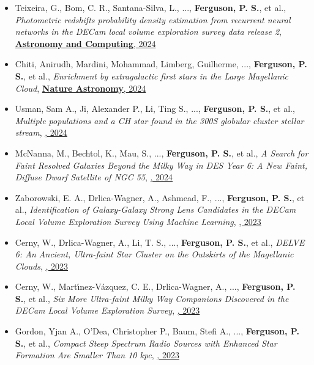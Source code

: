 \begin{itemize}[itemsep=1pt]
    \item {Teixeira}, G., {Bom}, C. R., {Santana-Silva}, L., ..., \textbf{Ferguson, P. S.}, et al., \textit{{Photometric redshifts probability density estimation from recurrent neural networks in the DECam local volume exploration survey data release 2}}, \href{https://ui.adsabs.harvard.edu/abs/2024A&C....4900886T}{\textbf{Astronomy and Computing}, 2024}
    \item {Chiti}, Anirudh, {Mardini}, Mohammad, {Limberg}, Guilherme, ..., \textbf{Ferguson, P. S.}, et al., \textit{{Enrichment by extragalactic first stars in the Large Magellanic Cloud}}, \href{https://ui.adsabs.harvard.edu/abs/2024NatAs...8..637C}{\textbf{Nature Astronomy}, 2024}
    \item {Usman}, Sam A., {Ji}, Alexander P., {Li}, Ting S., ..., \textbf{Ferguson, P. S.}, et al., \textit{{Multiple populations and a CH star found in the 300S globular cluster stellar stream}}, \href{https://ui.adsabs.harvard.edu/abs/2024MNRAS.529.2413U}{\textbf{\mnras}, 2024}
    \item {McNanna}, M., {Bechtol}, K., {Mau}, S., ..., \textbf{Ferguson, P. S.}, et al., \textit{{A Search for Faint Resolved Galaxies Beyond the Milky Way in DES Year 6: A New Faint, Diffuse Dwarf Satellite of NGC 55}}, \href{https://ui.adsabs.harvard.edu/abs/2024ApJ...961..126M}{\textbf{\apj}, 2024}
    \item {Zaborowski}, E. A., {Drlica-Wagner}, A., {Ashmead}, F., ..., \textbf{Ferguson, P. S.}, et al., \textit{{Identification of Galaxy-Galaxy Strong Lens Candidates in the DECam Local Volume Exploration Survey Using Machine Learning}}, \href{https://ui.adsabs.harvard.edu/abs/2023ApJ...954...68Z}{\textbf{\apj}, 2023}
    \item {Cerny}, W., {Drlica-Wagner}, A., {Li}, T. S., ..., \textbf{Ferguson, P. S.}, et al., \textit{{DELVE 6: An Ancient, Ultra-faint Star Cluster on the Outskirts of the Magellanic Clouds}}, \href{https://ui.adsabs.harvard.edu/abs/2023ApJ...953L..21C}{\textbf{\apjl}, 2023}
    \item {Cerny}, W., {Mart{\'\i}nez-V{\'a}zquez}, C. E., {Drlica-Wagner}, A., ..., \textbf{Ferguson, P. S.}, et al., \textit{{Six More Ultra-faint Milky Way Companions Discovered in the DECam Local Volume Exploration Survey}}, \href{https://ui.adsabs.harvard.edu/abs/2023ApJ...953....1C}{\textbf{\apj}, 2023}
    \item {Gordon}, Yjan A., {O'Dea}, Christopher P., {Baum}, Stefi A., ..., \textbf{Ferguson, P. S.}, et al., \textit{{Compact Steep Spectrum Radio Sources with Enhanced Star Formation Are Smaller Than 10 kpc}}, \href{https://ui.adsabs.harvard.edu/abs/2023ApJ...948L...9G}{\textbf{\apjl}, 2023}

\end{itemize}
